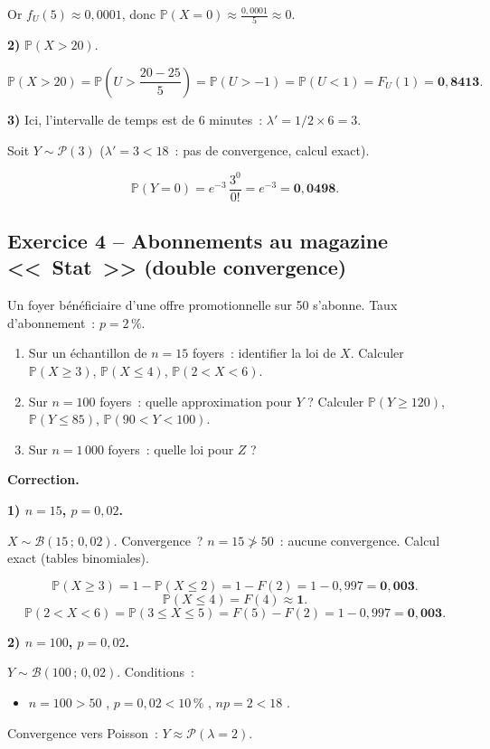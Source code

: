 \documentclass[11pt,a4paper]{article}
\renewcommand{\P}{\mathbb{P}}
\begin{document}
Or $f_U(5) \approx 0{,}0001$, donc $\P(X=0) \approx \frac{0{,}0001}{5} \approx 0$.

\textbf{2)} $\P(X > 20)$.

$$\P(X > 20) = \P\!\left(U > \frac{20-25}{5}\right) = \P(U > -1) = \P(U < 1) = F_U(1) = \mathbf{0{,}8413}.$$

\textbf{3)} Ici, l'intervalle de temps est de 6 minutes~: $\lambda' = 1/2 \times 6 = 3$.

Soit $Y \sim \mathcal{P}(3)$ ($\lambda' = 3 < 18$~: pas de convergence, calcul exact).

$$\P(Y = 0) = e^{-3}\,\frac{3^0}{0!} = e^{-3} = \mathbf{0{,}0498}.$$

\subsection{Exercice 4 -- Abonnements au magazine <<~{}Stat~>> (double convergence)}

\begin{exbox}[\'Enonc\'e]
Un foyer bénéficiaire d'une offre promotionnelle sur 50 s'abonne. Taux d'abonnement~: $p = 2\,\%$.

\begin{enumerate}
  \item Sur un \'echantillon de $n=15$ foyers~: identifier la loi de $X$. Calculer $\P(X\geq 3)$, $\P(X\leq 4)$, $\P(2<X<6)$.
  \item Sur $n=100$ foyers~: quelle approximation pour $Y$ ? Calculer $\P(Y\geq 120)$, $\P(Y\leq 85)$, $\P(90<Y<100)$.
  \item Sur $n=1\,000$ foyers~: quelle loi pour $Z$ ?
\end{enumerate}
\end{exbox}

\textbf{Correction.}

\textbf{1) $n=15$, $p=0{,}02$.}

$X \sim \mathcal{B}(15\,;\,0{,}02)$. Convergence~? $n=15 \not> 50$~: aucune convergence. Calcul exact (tables binomiales).

$$\P(X\geq 3) = 1 - \P(X\leq 2) = 1 - F(2) = 1 - 0{,}997 = \mathbf{0{,}003}.$$
$$\P(X \leq 4) = F(4) \approx \mathbf{1}.$$
$$\P(2 < X < 6) = \P(3 \leq X \leq 5) = F(5) - F(2) = 1 - 0{,}997 = \mathbf{0{,}003}.$$

\textbf{2) $n=100$, $p=0{,}02$.}

$Y \sim \mathcal{B}(100\,;\,0{,}02)$. Conditions~:
\begin{itemize}
  \item $n=100>50$ \checkmark, $p=0{,}02<10\,\%$ \checkmark, $np=2<18$ \checkmark.
\end{itemize}
Convergence vers Poisson~: $Y \approx \mathcal{P}(\lambda=2)$.
\end{document}
